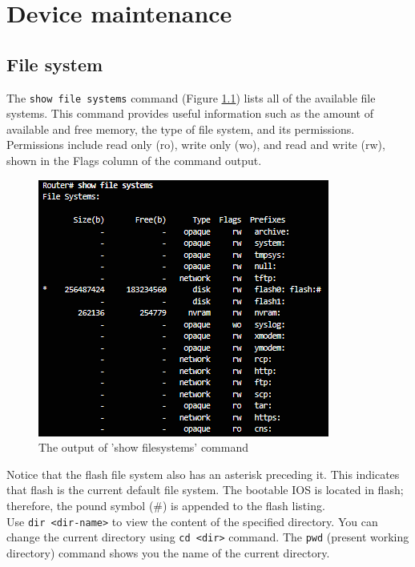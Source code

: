 \chapter{Device maintenance}

\section{File system}

The \verb|show file systems| command (Figure \ref{ShowFileSystem}) lists all of the available file systems. This command provides useful information such as the amount of available and free memory, the type of file system, and its permissions. Permissions include read only (ro), write only (wo), and read and write (rw), shown in the Flags column of the command output.\\

\begin{figure}[hbtp]
\caption{The output of 'show filesystems' command}\label{ShowFileSystem}
\centering
\includegraphics[scale=0.8]{pictures/ShowFileSystem.PNG}
\end{figure}

Notice that the flash file system also has an asterisk preceding it. This indicates that flash is the current default file system. The bootable IOS is located in flash; therefore, the pound symbol (\#) is appended to the flash listing.\\

Use \verb|dir <dir-name>| to view the content of the specified directory. You can change the current directory using \verb|cd <dir>| command. The \verb|pwd| (present working directory) command shows you the name of the current directory. \\

